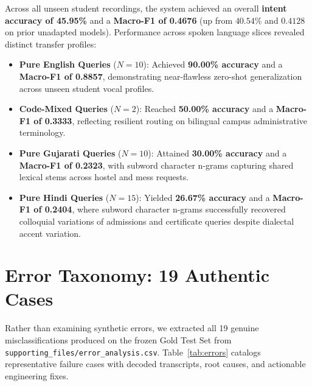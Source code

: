 \documentclass[sigconf,authordraft]{acmart}
\begin{document}
Across all unseen student recordings, the system achieved an overall \textbf{intent accuracy of 45.95\%} and a \textbf{Macro-F1 of 0.4676} (up from $40.54\%$ and $0.4128$ on prior unadapted models). Performance across spoken language slices revealed distinct transfer profiles:
\begin{itemize}
  \item \textbf{Pure English Queries} ($N=10$): Achieved \textbf{90.00\% accuracy} and a \textbf{Macro-F1 of 0.8857}, demonstrating near-flawless zero-shot generalization across unseen student vocal profiles.
  \item \textbf{Code-Mixed Queries} ($N=2$): Reached \textbf{50.00\% accuracy} and a \textbf{Macro-F1 of 0.3333}, reflecting resilient routing on bilingual campus administrative terminology.
  \item \textbf{Pure Gujarati Queries} ($N=10$): Attained \textbf{30.00\% accuracy} and a \textbf{Macro-F1 of 0.2323}, with subword character n-grams capturing shared lexical stems across hostel and mess requests.
  \item \textbf{Pure Hindi Queries} ($N=15$): Yielded \textbf{26.67\% accuracy} and a \textbf{Macro-F1 of 0.2404}, where subword character n-grams successfully recovered colloquial variations of admissions and certificate queries despite dialectal accent variation.
\end{itemize}

\section{Error Taxonomy: 19 Authentic Cases}
\label{sec:errors}

Rather than examining synthetic errors, we extracted all 19 genuine misclassifications produced on
the frozen Gold Test Set from \texttt{supporting\_files/error\_analysis.csv}. Table~\ref{tab:errors}
catalogs representative failure cases with decoded transcripts, root causes, and actionable engineering fixes.
\end{document}
